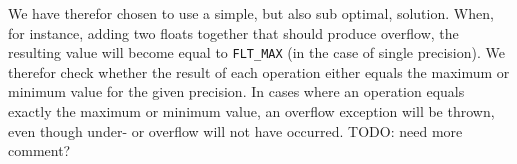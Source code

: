 We have therefor chosen to use a simple, but also sub optimal, solution. When,
for instance, adding two floats together that should produce overflow, the
resulting value will become equal to {\tt FLT\_MAX} (in the case of single
precision). We therefor check whether the result of each operation either equals
the maximum or minimum value for the given precision. In cases where an
operation equals exactly the maximum or minimum value, an overflow exception
will be thrown, even though under- or overflow will not have occurred. TODO:
need more comment?

